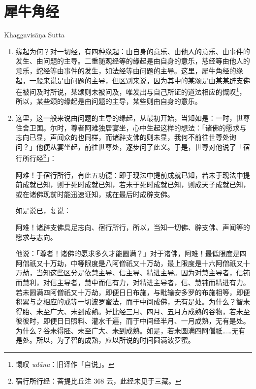 \section{犀牛角经}

\begin{center}Khaggavisāṇa Sutta\end{center}\vspace{1em}

\begin{enumerate}\item 缘起为何？对一切经，有四种缘起：由自身的意乐、由他人的意乐、由事件的发生、由问题的主导。二重随观经等的缘起是由自身的意乐，慈经等由他人的意乐，蛇经等由事件的发生，如法经等由问题的主导。这里，犀牛角经的缘起，一般来说是由问题的主导，但区别来说，因为其中的某颂是由某某辟支佛在被问及时所说，某颂则未被问及，唯发出与自己所证的道法相应的慨叹\footnote{慨叹 \textit{udāna}：旧译作「自说」。}，所以，某些颂的缘起是由问题的主导，某些则由自身的意乐。
\item 这里，这一般来说由问题的主导的缘起，从最初开始，当知如是：一时，世尊住舍卫国。尔时，尊者阿难独居宴坐，心中生起这样的想法：「诸佛的愿求与志向已显，声闻众的也同样，而诸辟支佛的则未显，我何不前往世尊处询问？」他便从宴坐起，前往世尊处，逐步问了此义。于是，世尊对他说了「宿行所行经\footnote{宿行所行经：菩提比丘注 368 云，此经未见于三藏。}」：\begin{quoting}阿难！于宿行所行，有此五功德：即于现法中提前成就已知，若未于现法中提前成就已知，则于死时成就已知，若未于死时成就已知，则成天子成就已知，或在诸佛现前时能迅速证知，或在最后时成辟支佛。\end{quoting}如是说已，复说：\begin{quoting}阿难！诸辟支佛具足志向、宿行所行，所以，当知一切佛、辟支佛、声闻等的愿求与志向。\end{quoting}他说：「尊者！诸佛的愿求多久才能圆满？」对于诸佛，阿难！最低限度是四阿僧祇又十万劫，中等限度是八阿僧祇又十万劫，最上限度是十六阿僧祇又十万劫，当知这些区分是依慧主导、信主导、精进主导。因为对慧主导者，信钝而慧利，对信主导者，慧中而信有力，对精进主导者，信、慧钝而精进有力。若未圆满四阿僧祇又十万劫，即便日日布施，与毗输安多罗的布施相等，即便积累与之相应的戒等一切波罗蜜法，而于中间成佛，无有是处。为什么？智未得胎、未至广大、未到成熟。好比经三月、四月、五月方成熟的谷物，若未至彼彼时，即便日日照料、灌水千遍，而于中间经半月、一月成熟，无有是处。为什么？谷未得胚、未至广大、未到成熟。如是，若未圆满四阿僧祇……无有是处。所以，为了智的成熟，应以所说的时间圆满波罗蜜。

\end{enumerate}
